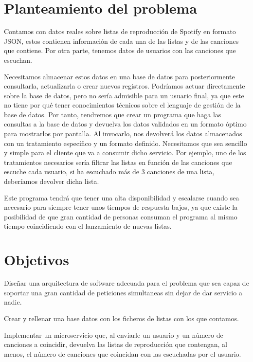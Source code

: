 \documentclass[12pt]{report} %
\begin{document}
	
	\section{Planteamiento del problema}
	Contamos con datos reales sobre listas de reproducción de Spotify en formato JSON, estos contienen información de cada una de las listas y de las canciones que contiene.
	Por otra parte, tenemos datos de usuarios con las canciones que escuchan.

	Necesitamos almacenar estos datos en una base de datos para posteriormente consultarla, actualizarla o crear nuevos registros. 
	Podríamos actuar directamente sobre la base de datos, pero no sería admisible para un usuario final, ya que este no tiene por qué tener conocimientos técnicos sobre el lenguaje de gestión de la base de datos.
	Por tanto, tendremos que crear un programa que haga las consultas a la base de datos y devuelva los datos validados en un formato óptimo para mostrarlos por pantalla. Al invocarlo, nos devolverá los datos almacenados con un tratamiento específico y un formato definido. Necesitamos que sea sencillo y simple para el cliente que va a consumir dicho servicio. 
	Por ejemplo, uno de los tratamientos necesarios sería filtrar las listas en función de las canciones que escuche cada usuario, si ha escuchado más de 3 canciones de una lista, deberíamos devolver dicha lista.
		
	Este programa tendrá que tener una alta disponibilidad y escalarse cuando sea necesario para siempre tener unos tiempos de respuesta bajos, ya que existe la posibilidad de que gran cantidad de personas consuman el programa al mismo tiempo coincidiendo con el lanzamiento de nuevas listas.
	
	\section{Objetivos}
		
	Diseñar una arquitectura de software adecuada para el problema que sea capaz de soportar una gran cantidad de peticiones simultaneas sin dejar de dar servicio a nadie.
	
	Crear y rellenar una base datos con los ficheros de listas con los que contamos.
	
	Implementar un microservicio que, al enviarle un usuario y un número de canciones a coincidir, devuelva las listas de reproducción que contengan, al menos, el número de canciones que coincidan con las escuchadas por el usuario.
	
\end{document}
